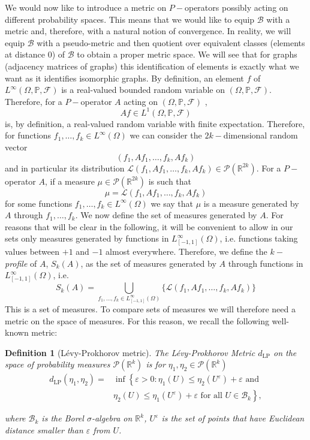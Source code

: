 \documentclass[11pt]{article}
\newtheorem{definition}[theorem]{Definition}
\def\R{\mathbb{R}}
\def\P{\mathbb{P}}
\begin{document}
We would now like to introduce a metric on $P-$operators possibly acting on different probability spaces. This means that we would like to equip $\mathcal{B}$ with a metric and, therefore, with a natural notion of convergence. In reality, we will equip $\mathcal{B}$ with a pseudo-metric and then quotient over equivalent classes (elements at distance $0$) of $\mathcal{B}$ to obtain a proper metric space.  We will see that for graphs (adjacency matrices of graphs) this identification of elements is exactly what we want as it identifies isomorphic graphs.\newline
By definition, an element $f$ of $L^\infty(\Omega,\P,\mathcal{F})$ is a real-valued bounded random variable on $(\Omega,\P,\mathcal{F})$. Therefore, for a $P-$operator $A$ acting on $(\Omega,\P,\mathcal{F})$ , 
$$
Af\in L^1(\Omega,\P,\mathcal{F}) $$is, by definition, a real-valued random variable with finite expectation. Therefore, for functions $f_1,\ldots,f_k\in L^{\infty}(\Omega)$ we can consider the $2k-$dimensional random vector
$$
(f_1,Af_1,\ldots , f_k,Af_k)
$$and in particular its distribution $\mathcal{L}(f_1,Af_1,\ldots , f_k,Af_k)\in \mathcal{P}(\R^{2k})$. For a $P-$operator $A$, if a measure $\mu\in\mathcal{P}(\R^{2k})$ is such that $$
\mu= \mathcal{L}(f_1,Af_1,\ldots , f_k,Af_k)
$$
for some functions $f_1,\ldots, f_k\in L^{\infty}(\Omega)$ we say that $\mu$ is a measure generated by $A$ through $f_1,\ldots, f_k$.
We now define the set of measures generated by $A$. For reasons that will be clear in the following, it will be convenient to allow in our sets only measures generated by functions in $L_{[-1,1]}^{\infty}(\Omega)$, i.e. functions taking values between $+1$ and $-1$ almost everywhere. Therefore, we define the $k-$\emph{profile} of $A$,  $S_k(A)$, as the set of measures generated by $A$ through functions in  $L_{[-1,1]}^{\infty}(\Omega)$, i.e.\
$$S_k(A)=\bigcup_{f_1,\ldots, f_k\in L_{[-1,1]}^{\infty}(\Omega)}\{\mathcal{L}(f_1,Af_1,\ldots , f_k,Af_k)\}
$$This is a set of measures. To compare sets of measures we will therefore need  a metric on the space of measures.  For this reason, we recall the following well-known metric:

\begin{definition}[Lévy-Prokhorov metric]\label{LevyProk}
 The \emph{Lévy-Prokhorov Metric} $d_{\mathrm{LP}}$ on the space of probability measures $\mathcal{P}\left(\mathbb{R}^{k}\right)$ is for $\eta_1,\eta_2\in \mathcal{P}\left(\mathbb{R}^{k}\right)$
$$\begin{aligned}
d_{\mathrm{LP}}\left(\eta_{1}, \eta_{2}\right)=&\inf \left\{\varepsilon>0: \eta_{1}(U) \leq \eta_{2}\left(U^{\varepsilon}\right)+\varepsilon \text{ and } \right.\\
&\left.\eta_{2}(U) \leq \eta_{1}\left(U^{\varepsilon}\right)+\varepsilon  \text{ for all } U \in \mathcal{B}_{k}\right\},
\end{aligned}$$

where $\mathcal{B}_{k}$ is the Borel $\sigma$-algebra on $\mathbb{R}^{k}$, $U^{\varepsilon}$ is the set of points that have Euclidean distance smaller than $\varepsilon$ from $U$.
\end{definition}
\end{document}
